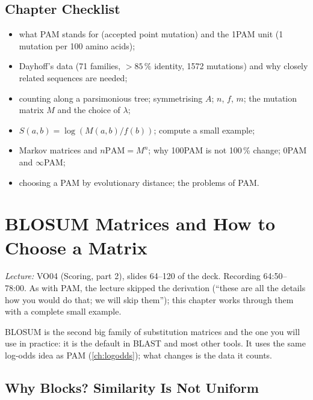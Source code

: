 \documentclass[11pt, oneside]{book}
\newcommand{\lectureref}[1]{%
  \par{\small\color{gray!70!black}\textit{Lecture:} #1}\par}
\let\originalsection\section
\renewcommand{\section}{\Needspace{7\baselineskip}\originalsection}
\begin{document}
\section{Chapter Checklist}

\begin{itemize}
  \item what PAM stands for (accepted point mutation) and the 1PAM unit (1
    mutation per 100 amino acids);
  \item Dayhoff's data (71 families, $>85\,\%$ identity, 1572 mutations) and why
    closely related sequences are needed;
  \item counting along a parsimonious tree; symmetrising $A$;
    $n$, $f$, $m$; the mutation matrix $M$ and the choice of $\lambda$;
  \item $S(a,b) = \log(M(a,b)/f(b))$; compute a small example;
  \item Markov matrices and $n\mathrm{PAM} = M^n$; why 100PAM is not 100\,\%
    change; 0PAM and $\infty$PAM;
  \item choosing a PAM by evolutionary distance; the problems of PAM.
\end{itemize}

\chapter{BLOSUM Matrices and How to Choose a Matrix}
\label{ch:blosum}

\lectureref{VO04 (Scoring, part 2), slides 64--120 of the deck. Recording
64:50--78:00. As with PAM, the lecture skipped the derivation (``these are all
the details how you would do that; we will skip them''); this chapter works
through them with a complete small example.}

BLOSUM is the second big family of substitution matrices and the one you will
use in practice: it is the default in BLAST and most other tools. It uses the
same log-odds idea as PAM (\cref{ch:logodds}); what changes is the data it
counts.

\section{Why Blocks? Similarity Is Not Uniform}
\end{document}
